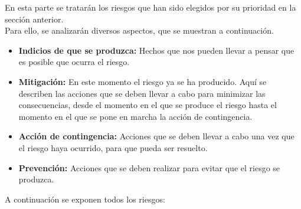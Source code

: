 \documentclass[spanish,a4paper,12pt]{report}	%
\begin{document}
	En esta parte se tratarán los riesgos que han sido elegidos por su prioridad en la sección anterior.\\
	Para ello, se analizarán diversos aspectos, que se muestran a continuación.
		\begin{itemize}
			\item \textbf {Indicios de que se produzca: }Hechos que nos pueden llevar a pensar que es posible que ocurra
							el riesgo.
			\item \textbf {Mitigación: }En este momento el riesgo ya se ha producido. Aquí se describen las acciones
							que se deben llevar a cabo para minimizar las consecuencias, desde el momento en el que
							se produce el riesgo hasta el momento en el que se pone en marcha la acción de contingencia.
			\item \textbf {Acción de contingencia: }Acciones que se deben llevar a cabo una vez que el riesgo haya
							ocurrido, para que pueda ser resuelto.
			\item \textbf {Prevención: }Acciones que se deben realizar para evitar que el riesgo se produzca.
			
		\end{itemize}
	A continuación se exponen todos los riesgos:\\ \ \\ \ \\
	\setcounter{section}{0}
\end{document}
